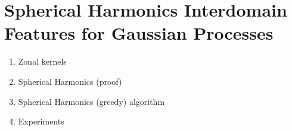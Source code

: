 \chapter{Spherical Harmonics Interdomain Features for Gaussian Processes}

\begin{enumerate}
    \item Zonal kernels
    \item Spherical Harmonics (proof)
    \item Spherical Harmonics (greedy) algorithm
    \item Experiments
\end{enumerate}